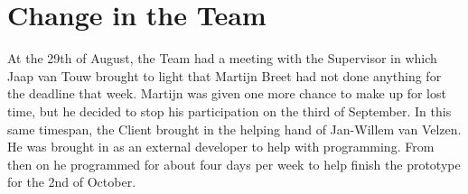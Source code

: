 \section{Change in the Team}
\thispagestyle{fancy}
\label{sec:teamchange}
At the 29th of August, the Team had a meeting with the Supervisor in which Jaap van Touw brought to light that Martijn Breet had not done anything for the deadline that week. Martijn was given one more chance to make up for lost time, but he decided to stop his participation on the third of September. In this same timespan, the Client brought in the helping hand of Jan-Willem van Velzen. He was brought in as an external developer to help with programming. From then on he programmed for about four days per week to help finish the prototype for the 2nd of October. 